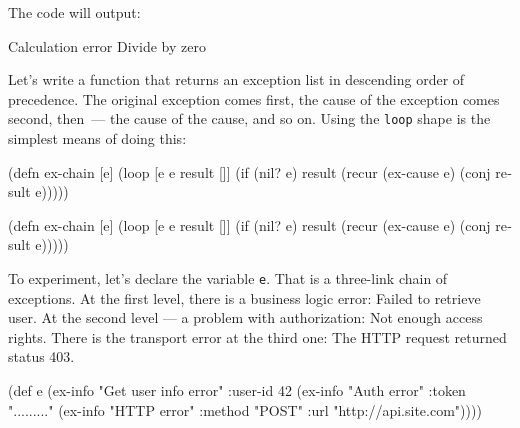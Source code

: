 \fi

\noindent
The code will output:

\begin{english}
  \begin{text}
Calculation error
Divide by zero
  \end{text}
\end{english}

Let's write a function that returns an exception list in descending order of precedence. The original exception comes first, the cause of the exception comes second, then~--- the cause of the cause, and so on. Using the \verb|loop| shape is the simplest means of doing this: 


\ifx\DEVICETYPE\MOBILE

\begin{english}
  \begin{clojure}
(defn ex-chain [e]
  (loop [e e
         result []]
    (if (nil? e)
      result
      (recur (ex-cause e)
        (conj result e)))))
  \end{clojure}
\end{english}

\else

\begin{english}
  \begin{clojure}
(defn ex-chain [e]
  (loop [e e
         result []]
    (if (nil? e)
      result
      (recur (ex-cause e) (conj result e)))))
  \end{clojure}
\end{english}

\fi

To experiment, let's declare the variable \verb|e|. That is a three-link chain of exceptions. At the first level, there is a business logic error: Failed to retrieve user. At the second level — a problem with authorization: Not enough access rights. There is the transport error at the third one: The HTTP request returned status 403.

\label{e-sample}

\ifx\DEVICETYPE\MOBILE

\begin{english}
  \begin{clojure}
(def e
  (ex-info
   "Get user info error"
   {:user-id 42}
   (ex-info
     "Auth error"
     {:token "........."}
     (ex-info
       "HTTP error"
       {:method "POST"
        :url "http://api.site.com"}))))
  \end{clojure}
\end{english}

